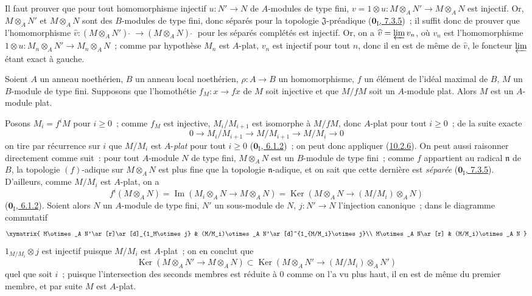 Il faut prouver que pour tout homomorphisme injectif $u:N'\to N$ de
$A$-modules de type fini, $v=1\otimes u:M\otimes_A N'\to M\otimes_A N$ est
injectif. Or, $M\otimes_A N'$ et $M\otimes_A N$ sont des $B$-modules de type
fini, donc séparés pour la topologie $\mathfrak{J}$-préadique
(\hyperref[0.7.3.5-fr]{$\mathbf{0}_{\mathrm I}$, 7.3.5})~; il suffit donc de prouver que
l'homomorphisme
$\widehat v:(M\otimes_A N'){\,\widehat{\,}\,}\to(M\otimes_A N){\,\widehat{\,}\,}$ pour les
séparés complétés est injectif. Or, on a $\widehat v=\varprojlim v_n$, où
$v_n$ est l'homomorphisme $1\otimes u:M_n\otimes_A N'\to M_n\otimes_A N$~;
comme par hypothèse $M_n$ est $A$-plat, $v_n$ est injectif pour tout $n$, donc
il en est de même de $\widehat v$, le foncteur $\varprojlim$ étant exact à gauche.

\begin{corollary}[10.2.7]
\label{0.10.2.7-fr}
Soient $A$ un anneau noethérien, $B$ un anneau local noethérien,
$\rho:A\to B$ un homomorphisme, $f$ un élément de l'idéal maximal de $B$, $M$
un $B$-module de type fini. Supposons que l'homothétie
$f_M:x\to fx$ de $M$ soit injective et que $M/fM$ soit un $A$-module
plat. Alors $M$ est un $A$-module plat.
\end{corollary}

Posons $M_i=f^iM$ pour $i\geq0$~; comme $f_M$ est injective,
$M_i/M_{i+1}$ est isomorphe à $M/fM$, donc $A$-plat pour tout $i\geq0$~; de
la suite exacte
\[
  0\longrightarrow M_i/M_{i+1}\longrightarrow M/M_{i+1}
  \longrightarrow M/M_i\longrightarrow0
\]
on tire par récurrence sur $i$ que $M/M_i$ est $A$-\emph{plat} pour tout
$i\geq0$ (\hyperref[0.6.1.2-fr]{$\mathbf{0}_{\mathrm I}$, 6.1.2})~; on peut donc
appliquer (\hyperref[0.10.2.6-fr]{10.2.6}). On peut aussi raisonner directement
comme suit~: pour tout $A$-module $N$ de type fini, $M\otimes_A N$ est un
$B$-module de type fini~; comme $f$ appartient au radical $\mathfrak n$ de
$B$, la topologie $(f)$-adique sur $M\otimes_A N$ est plus fine que la
topologie $\mathfrak n$-adique, et on sait que cette dernière est \emph{séparée}
(\hyperref[0.7.3.5-fr]{$\mathbf{0}_{\mathrm I}$, 7.3.5}). D'ailleurs, comme $M/M_i$ est
$A$-plat, on a
\[
  f^i(M\otimes_A N)=\operatorname{Im}(M_i\otimes_A N\to M\otimes_A N)
  =\operatorname{Ker}(M\otimes_A N\to(M/M_i)\otimes_A N)
\]
(\hyperref[0.6.1.2-fr]{$\mathbf{0}_{\mathrm I}$, 6.1.2}). Soient alors $N$ un
$A$-module de type fini, $N'$ un sous-module de $N$, $j:N'\to N$ l'injection
canonique~; dans le diagramme commutatif
\[
\xymatrix{
  M\otimes_A N'\ar[r]\ar[d]_{1_M\otimes j} &
  (M/M_i)\otimes_A N'\ar[d]^{1_{M/M_i}\otimes j}\\
  M\otimes_A N\ar[r] & (M/M_i)\otimes_A N
}
\]
$1_{M/M_i}\otimes j$ est injectif puisque $M/M_i$ est $A$-plat~; on en
conclut que
\[
  \operatorname{Ker}(M\otimes_A N'\to M\otimes_A N)
  \subset\operatorname{Ker}(M\otimes_A N'\to(M/M_i)\otimes_A N')
\]
quel que soit $i$~; puisque l'intersection des seconds membres est réduite à
$0$ comme on l'a vu plus haut, il en est de même du premier membre, et par
suite $M$ est $A$-plat.

